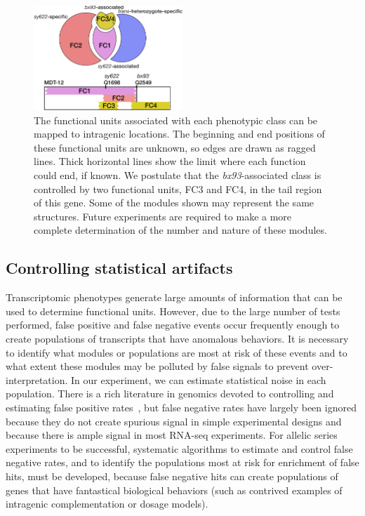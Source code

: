 \documentclass[10pt, twocolumn]{article}
\begin{document}
\begin{figure}
  \centering{}
  \includegraphics[width=0.5\textwidth]{../figs/inferred_domains.pdf}
  \caption{
    The functional units associated with each phenotypic class can be
    mapped to intragenic locations. The beginning and end positions of
    these functional units are unknown,
    so edges are drawn as ragged lines. Thick horizontal lines show the
    limit where each function could end, if known. We postulate that the
    \emph{bx93}-associated class is controlled by two functional units, FC3 and
    FC4, in the tail region of this gene. Some of the modules shown may
    represent the same structures. Future experiments are required to make a more
    complete determination of the number and nature of these modules.
  }
\label{fig:domains}
\end{figure}


\subsection*{Controlling statistical artifacts}
Transcriptomic phenotypes generate large amounts of information that can be used
to determine functional units. However, due to the large number of tests
performed, false positive and false negative events occur frequently enough to
create populations of transcripts that have anomalous behaviors. It is necessary
to identify what modules or populations are most at risk of these events and to
what extent these modules may be polluted by false signals to prevent
over-interpretation. In our experiment, we can estimate statistical noise in
each population. There is a rich literature in genomics devoted to controlling
and estimating false positive rates~\cite{Storey2003,Benjamini1995}, but false
negative rates have largely been ignored because they do not create spurious
signal in simple experimental designs and because there is ample signal in most
RNA-seq experiments. For allelic series experiments to be successful, systematic
algorithms to estimate and control false negative rates, and to identify the
populations most at risk for enrichment of false hits, must be developed,
because false negative hits can create populations of genes that have
fantastical biological behaviors (such as contrived examples of intragenic
complementation or dosage models).
\end{document}
